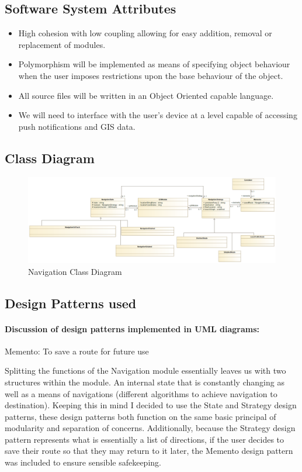 	\subsection{Software System Attributes}
	\begin{itemize}
		\small 
		\item High cohesion with low coupling allowing for easy addition, removal or replacement of modules.
		\item Polymorphism will be implemented as means of specifying object behaviour when the user imposes restrictions upon the base behaviour of the object.
		\item All source files will be written in an Object Oriented capable language.
		\item We will need to interface with the user's device at a level capable of accessing push notifications and 
		 GIS data.
	\end{itemize}
	
	\subsection{Class Diagram}
	\begin{figure}[H]
	\includegraphics[width=\linewidth]{Navigation/NavigationModuleClassDiagram(v2_noMethods).png}
	\caption{Navigation Class Diagram}
	\label{fig:UML1}
	\end{figure}
	
	\subsection{Design Patterns used}
	\paragraph{Discussion of design patterns implemented in UML diagrams:}
		Memento: To save a route for future use
		
		Splitting the functions of the Navigation module essentially leaves us with two structures within the module. An internal state that is constantly changing as well as a means of navigations (different algorithms to achieve navigation to destination). Keeping this in mind I decided to use the State and Strategy design patterns, these design patterns both function on the same basic principal of modularity and separation of concerns. Additionally, because the Strategy design pattern represents what is essentially a list of directions, if the user decides to save their route so that they may return to it later, the Memento design pattern was included to ensure sensible safekeeping.
		
